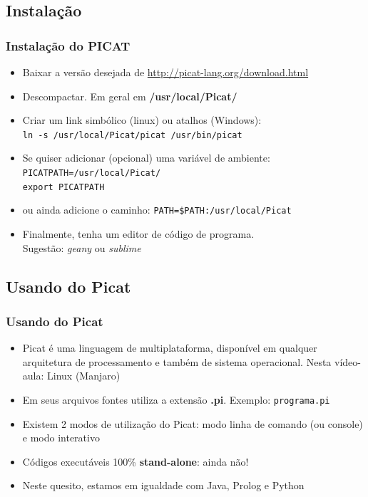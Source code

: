 \documentclass[10pt]{beamer}
\begin{document}
\subsection{Instalação}
\begin{frame}
    \frametitle{Instalação do PICAT}

  \begin{itemize}
    \item Baixar a versão desejada de \url{http://picat-lang.org/download.html}
   \item Descompactar. Em geral em \textbf{/usr/local/Picat/}
    \item Criar um link simbólico (linux) ou atalhos (Windows):\\ 
   \texttt{ln -s /usr/local/Picat/picat  /usr/bin/picat}
    \item Se quiser adicionar (opcional) uma variável de ambiente:\\
          \texttt{PICATPATH=/usr/local/Picat/}\\
          \texttt{export PICATPATH}

    \item ou ainda adicione o caminho: \texttt{PATH=\$PATH:/usr/local/Picat}

   \item Finalmente, tenha um editor de código de programa.\\
     Sugestão: \textit{geany} ou \textit{sublime}
    
  \end{itemize}



\end{frame}



\subsection{Usando do Picat}

\begin{frame}
    \frametitle{Usando do Picat}
    \begin{itemize}
     \item Picat é uma linguagem de multiplataforma, disponível em qualquer arquitetura de processamento e também de sistema operacional. Nesta vídeo-aula: Linux (Manjaro)
     \item Em seus arquivos fontes utiliza a extensão \textbf{.pi}. Exemplo: \texttt{programa.pi}
     \item Existem 2 modos de utilização do Picat: modo linha de comando (ou console) e modo interativo
     \item Códigos executáveis 100\% \textbf{stand-alone}: ainda não!
     \item Neste quesito, estamos em igualdade com Java, Prolog e Python
     
    \end{itemize}
\end{frame}
\end{document}
